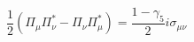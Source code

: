 \begin{equation} 
\frac{1}{2} (\Pi_{\mu} \Pi_{\nu}^{*} - \Pi_{\nu} \Pi_{\mu}^{*}) = 
\frac{1- \gamma_{5}}{2} i \sigma_{\mu \nu} 
\end{equation} 
